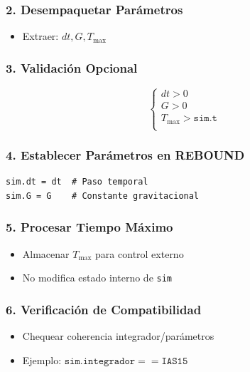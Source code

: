 \subsubsection*{2. Desempaquetar Parámetros}
\begin{itemize}
    \item Extraer: $dt, G, T_{\text{max}}$
\end{itemize}

\subsubsection*{3. Validación Opcional}
\begin{equation*}
    \begin{cases}
    dt > 0 \\
    G > 0 \\
    T_{\text{max}} > \texttt{sim.t} \\
    \end{cases}
\end{equation*}

\subsubsection*{4. Establecer Parámetros en REBOUND}
\begin{verbatim}
sim.dt = dt  # Paso temporal
sim.G = G    # Constante gravitacional
\end{verbatim}

\subsubsection*{5. Procesar Tiempo Máximo}
\begin{itemize}
    \item Almacenar $T_{\text{max}}$ para control externo
    \item No modifica estado interno de \texttt{sim}
\end{itemize}

\subsubsection*{6. Verificación de Compatibilidad}
\begin{itemize}
    \item Chequear coherencia integrador/parámetros
    \item Ejemplo: $\texttt{sim.integrador} == \texttt{IAS15}$
\end{itemize}

